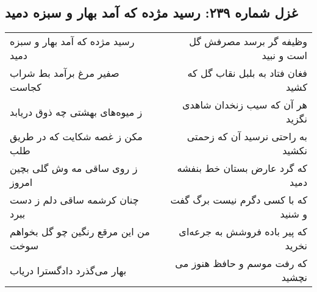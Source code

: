 \begin{center}
\section*{غزل شماره ۲۳۹: رسید مژده که آمد بهار و سبزه دمید}
\label{sec:sh239}
\begin{longtable}{l p{0.5cm} r}
رسید مژده که آمد بهار و سبزه دمید
&&
وظیفه گر برسد مصرفش گل است و نبید
\\
صفیر مرغ برآمد بط شراب کجاست
&&
فغان فتاد به بلبل نقاب گل که کشید
\\
ز میوه‌های بهشتی چه ذوق دریابد
&&
هر آن که سیب زنخدان شاهدی نگزید
\\
مکن ز غصه شکایت که در طریق طلب
&&
به راحتی نرسید آن که زحمتی نکشید
\\
ز روی ساقی مه وش گلی بچین امروز
&&
که گرد عارض بستان خط بنفشه دمید
\\
چنان کرشمه ساقی دلم ز دست ببرد
&&
که با کسی دگرم نیست برگ گفت و شنید
\\
من این مرقع رنگین چو گل بخواهم سوخت
&&
که پیر باده فروشش به جرعه‌ای نخرید
\\
بهار می‌گذرد دادگسترا دریاب
&&
که رفت موسم و حافظ هنوز می نچشید
\\
\end{longtable}
\end{center}
